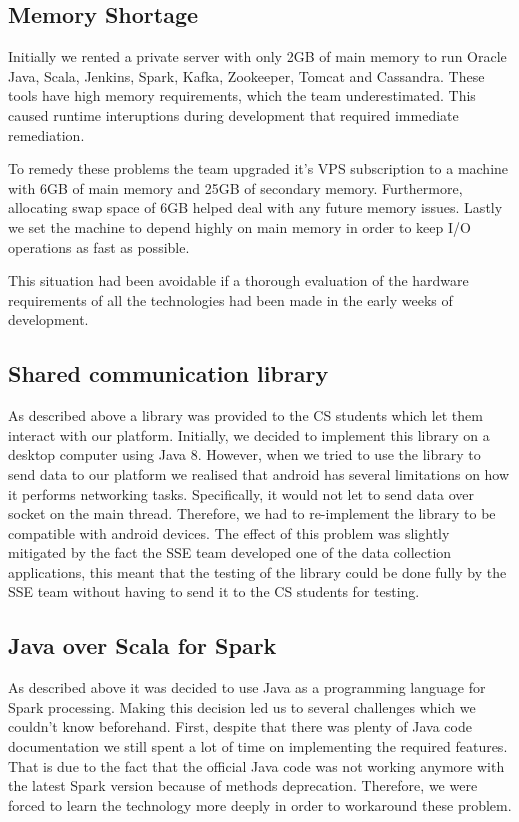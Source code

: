 \documentclass[prodmode,acmtosem]{acmsmall} %
\begin{document}
\subsection{Memory Shortage}
Initially we rented a private server with only 2GB of main memory to run Oracle Java, Scala, Jenkins, Spark, Kafka, Zookeeper, Tomcat and Cassandra. These tools have high memory requirements, which the team underestimated. This caused runtime interuptions during development that required immediate remediation. 

To remedy these problems the team upgraded it's VPS subscription to a machine with 6GB of main memory and 25GB of secondary memory. Furthermore, allocating swap space of 6GB helped deal with any future memory issues. Lastly we set the machine to depend highly on main memory in order to keep I/O operations as fast as possible.

This situation had been avoidable if a thorough evaluation of the hardware requirements of all the technologies had been made in the early weeks of development.

\subsection{Shared communication library}
As described above a library was provided to the CS students which let them interact with our platform. Initially, we decided to implement this library on a desktop computer using Java 8. However, when we tried to use the library to send data to our platform we realised that android has several limitations on how it performs networking tasks. Specifically, it would not let to send data over socket on the main thread. Therefore, we had to re-implement the library to be compatible with android devices. The effect of this problem was slightly mitigated by the fact the SSE team developed one of the data collection applications, this meant that the testing of the library could be done fully by the SSE team without having to send it to the CS students for testing.

\subsection{Java over Scala for Spark}
As described above it was decided to use Java as a programming language for Spark processing. Making this decision led us to several challenges which we couldn't know beforehand. First, despite that there was plenty of Java code documentation we still spent a lot of time on implementing the required features. That is due to the fact that the official Java code was not working anymore with the latest Spark version because of methods deprecation. Therefore, we were forced to learn the technology more deeply in order to workaround these problem. 
\end{document}
